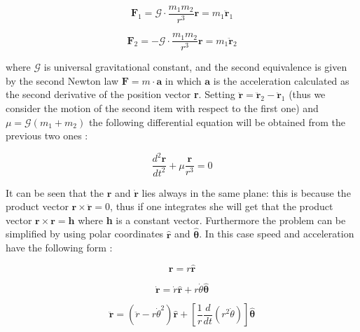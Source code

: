 \documentclass[12pt,%
               a4paper,%
               oneside,openany,%
               titlepage,%
               headinclude,footinclude,%
               BCOR5mm,%
               cleardoublepage=empty,%
               tablecaptionabove,%
               floatperchapter,
               ]{scrreprt}                 %
\begin{document}
\begin{equation}
\textbf{F}_{1}=\mathcal{G} \cdot \frac{m_{1}m_{2}}{r^{3}}\textbf{r}=m_{1} \ddot{\textbf{r}}_{1}
\end{equation}

\begin{equation}
\textbf{F}_{2}=-\mathcal{G} \cdot \frac{m_{1}m_{2}}{r^{3}}\textbf{r}=m_{1} \ddot{\textbf{r}}_{2}
\end{equation}

where $\mathcal{G}$ is universal gravitational constant, and the second equivalence is given by the second Newton law $\textbf{F}=m\cdot \textbf{a}$ in which $\textbf{a}$ is the acceleration calculated as the second derivative of the position vector \textbf{r}. Setting $\ddot{\textbf{r}}=\ddot{\textbf{r}}_{2}-\ddot{\textbf{r}}_{1}$ (thus we consider the motion of the second item with respect to the first one) and $\mu=\mathcal{G}(m_{1}+m_{2})$ the following differential equation will be obtained from the previous two ones \cite{murray1999solar}:

\begin{equation}
\dfrac{d^{2}\textbf{r}}{dt^{2}}+\mu\dfrac{\textbf{r}}{r^{3}}=0
\end{equation}


It can be seen that the $\textbf{r}$ and $\dot{\textbf{r}}$ lies always in the same plane: this is because the product vector $\textbf{r} \times \ddot{ \textbf{r}}=0$, thus if one integrates she will get that the product vector $\textbf{r} \times \textbf{r}=\textbf{h}$ where \textbf{h} is a constant vector. Furthermore the problem can be simplified by using polar coordinates  $\hat{\textbf{r}}$ and $\hat{\boldsymbol{\theta}}$. In this case speed and acceleration have the following form \cite{murray1999solar}:

\begin{equation}
\textbf{r}=r\hat{\textbf{r}}
\end{equation}

\begin{equation}
\dot{\textbf{r}}=\dot{r}\hat{\textbf{r}}+r\dot{\theta}\hat{\boldsymbol{\theta}}
\label{eq_dyn_nop}
\end{equation}

\begin{equation}
\ddot{\textbf{r}}=\left(\ddot{r}-r\dot{\theta}^{2}\right)\hat{\textbf{r}}+\left[\dfrac{1}{r}\frac{d}{dt}\left(r^{2}\dot{\theta}\right)\right]\hat{\boldsymbol{\theta}}
\end{equation}
\end{document}
